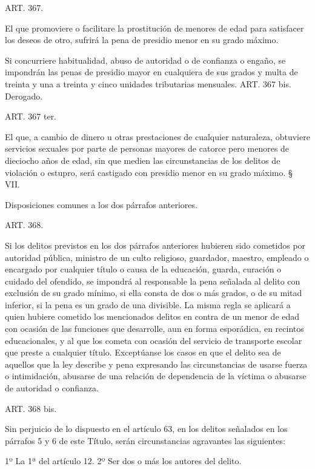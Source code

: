     ART. 367.

    El que promoviere o facilitare la prostitución de menores de edad para satisfacer los deseos de otro, sufrirá la pena de presidio menor en su grado máximo.

    Si concurriere habitualidad, abuso de autoridad o de confianza o engaño, se impondrán las penas de presidio mayor en cualquiera de sus grados y multa de treinta y una a treinta y cinco unidades tributarias mensuales.
    ART. 367 bis.    Derogado.

    ART. 367 ter.

    El que, a cambio de dinero u otras prestaciones de cualquier naturaleza, obtuviere servicios sexuales por parte de personas mayores de catorce pero menores de dieciocho años de edad, sin que medien las circunstancias de los delitos de violación o estupro, será castigado con presidio menor en su grado máximo.
    § VII.

    Disposiciones comunes a los dos párrafos anteriores.

    ART. 368.

    Si los delitos previstos en los dos párrafos anteriores hubieren sido cometidos por autoridad pública, ministro de un culto religioso, guardador, maestro, empleado o encargado por cualquier título o causa de la educación, guarda, curación o cuidado del ofendido, se impondrá al responsable la pena señalada al delito con exclusión de su grado mínimo, si ella consta de dos o más grados, o de su mitad inferior, si la pena es un grado de una divisible. La misma regla se aplicará a quien hubiere cometido los mencionados delitos en contra de un menor de edad con ocasión de las funciones que desarrolle, aun en forma esporádica, en recintos educacionales, y al que los cometa con ocasión del servicio de transporte escolar que preste a cualquier título.
    Exceptúanse los casos en que el delito sea de aquellos que la ley describe y pena expresando las circunstancias de usarse fuerza o intimidación, abusarse de una relación de dependencia de la víctima o abusarse de autoridad o confianza.




    ART. 368 bis.

    Sin perjuicio de lo dispuesto en el artículo 63, en los delitos señalados en los párrafos 5 y 6 de este Título, serán circunstancias agravantes las siguientes:

    1º La 1ª del artículo 12.
    2º Ser dos o más los autores del delito.



